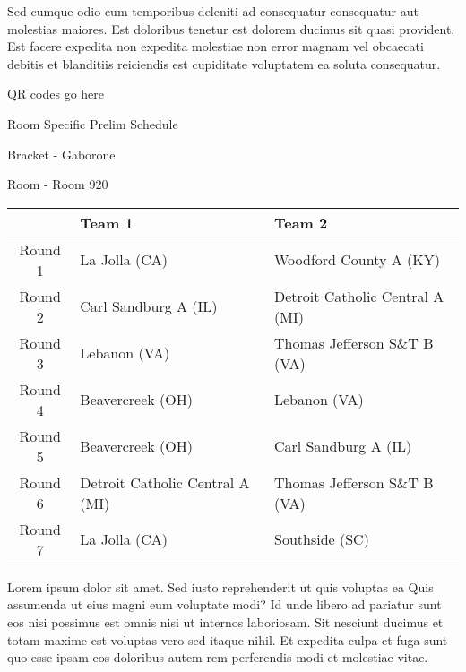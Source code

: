 \documentclass{article}%
\begin{document}
\newline%
Sed cumque odio eum temporibus deleniti ad consequatur consequatur aut molestias maiores. Est doloribus tenetur est dolorem ducimus sit quasi provident. Est facere expedita non expedita molestiae non error magnam vel obcaecati debitis et blanditiis reiciendis est cupiditate voluptatem ea soluta consequatur.%
\vspace*{140pt}%
\begin{center}%
\begin{Huge}%
QR codes go here%
\end{Huge}%
\end{center}%
\newpage%
\begin{center}%
\begin{Huge}%
Room Specific Prelim Schedule%
\end{Huge}%
\vspace*{8pt}%
\linebreak%
\begin{Large}%
Bracket {-} Gaborone%
\end{Large}%
\vspace*{8pt}%
\linebreak%
\vspace*{8pt}%
\begin{Large}%
Room {-} Room 920%
\end{Large}%
\end{center}%
%
\begin{tabularx}{\textwidth}{|c|Y|Y|}%
\hline%
&Team 1&Team 2\\%
\hline%
Round 1&La Jolla (CA)&Woodford County A (KY)\\%
Round 2&Carl Sandburg A (IL)&Detroit Catholic Central A (MI)\\%
Round 3&Lebanon (VA)&Thomas Jefferson S\&T B (VA)\\%
Round 4&Beavercreek (OH)&Lebanon (VA)\\%
Round 5&Beavercreek (OH)&Carl Sandburg A (IL)\\%
Round 6&Detroit Catholic Central A (MI)&Thomas Jefferson S\&T B (VA)\\%
Round 7&La Jolla (CA)&Southside (SC)\\%
\hline%
\end{tabularx}%
\vspace*{8pt}%
\newline%
Lorem ipsum dolor sit amet. Sed iusto reprehenderit ut quis voluptas ea Quis assumenda ut eius magni eum voluptate modi? Id unde libero ad pariatur sunt eos nisi possimus est omnis nisi ut internos laboriosam. Sit nesciunt ducimus et totam maxime est voluptas vero sed itaque nihil. Et expedita culpa et fuga sunt quo esse ipsam eos doloribus autem rem perferendis modi et molestiae vitae.\newline%
\end{document}
